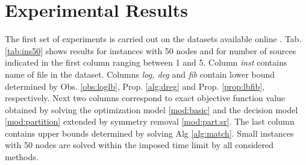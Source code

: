 \section{Experimental Results}

The first set of experiments is carried out on the datasets available online \cite{datasets}.
Tab. \ref{tab:ins50} shows results for instances with 50 nodes and for number of sources indicated in the first column ranging between 1 and 5. 
Column \emph{inst} contains name of file in the dataset.
Columns \emph{log, deg} and \emph{fib} contain lower bound determined by Obs. \ref{obs:loglb}, Prop. \ref{alg:dreg} and Prop. \ref{prop:lbfib}, respectively.
Next two columns correspond to exact objective function value obtained by solving the optimization model \eqref{mod:basic} and the decision model \eqref{mod:partition} 
extended by symmetry removal \eqref{mod:part:sr}.
The last column contains upper bounds determined by solving Alg \ref{alg:match}.
Small instances with 50 nodes are solved within the imposed time limit by all considered methods. 


